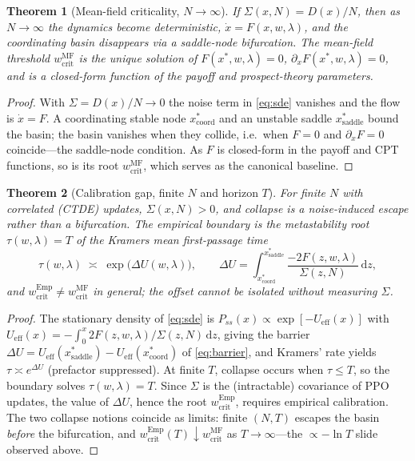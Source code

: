 \documentclass[letterpaper]{article}
\theoremstyle{plain}
\newtheorem{theorem}{Theorem}
\begin{document}
\begin{theorem}[Mean-field criticality, $N\to\infty$]\label{thm:mf}
If $\Sigma(x,N)=D(x)/N$, then as $N\to\infty$ the dynamics become deterministic,
$\dot x=F(x,w,\lambda)$, and the coordinating basin disappears via a saddle-node
bifurcation. The mean-field threshold $w_{\mathrm{crit}}^{\mathrm{MF}}$ is the
unique solution of $F(x^\ast,w,\lambda)=0$, $\partial_x F(x^\ast,w,\lambda)=0$,
and is a closed-form function of the payoff and prospect-theory parameters.
\end{theorem}
\begin{proof}
With $\Sigma=D(x)/N\to0$ the noise term in \eqref{eq:sde} vanishes and the flow
is $\dot x=F$. A coordinating stable node $x^\ast_{\mathrm{coord}}$ and an
unstable saddle $x^\ast_{\mathrm{saddle}}$ bound the basin; the basin vanishes
when they collide, i.e.\ when $F=0$ and $\partial_x F=0$ coincide---the
saddle-node condition. As $F$ is closed-form in the payoff and CPT functions, so
is its root $w_{\mathrm{crit}}^{\mathrm{MF}}$, which serves as the canonical
baseline.
\end{proof}

\begin{theorem}[Calibration gap, finite $N$ and horizon $T$]\label{thm:gap}
For finite $N$ with correlated (CTDE) updates, $\Sigma(x,N)>0$, and collapse is a
noise-induced escape rather than a bifurcation. The empirical boundary is the
metastability root $\tau(w,\lambda)=T$ of the Kramers mean first-passage time
\begin{equation}
  \tau(w,\lambda)\;\asymp\;
  \exp\!\big(\Delta U(w,\lambda)\big),\qquad
  \Delta U=\!\!\int_{x^\ast_{\mathrm{coord}}}^{x^\ast_{\mathrm{saddle}}}\!\!
    \frac{-2F(z,w,\lambda)}{\Sigma(z,N)}\,\mathrm{d}z,
  \label{eq:barrier}
\end{equation}
and $w_{\mathrm{crit}}^{\mathrm{Emp}}\neq w_{\mathrm{crit}}^{\mathrm{MF}}$ in
general; the offset cannot be isolated without measuring $\Sigma$.
\end{theorem}
\begin{proof}
The stationary density of \eqref{eq:sde} is
$P_{ss}(x)\propto\exp[-U_{\mathrm{eff}}(x)]$ with
$U_{\mathrm{eff}}(x)=-\!\int_0^x 2F(z,w,\lambda)/\Sigma(z,N)\,\mathrm{d}z$, giving
the barrier $\Delta U=U_{\mathrm{eff}}(x^\ast_{\mathrm{saddle}})
-U_{\mathrm{eff}}(x^\ast_{\mathrm{coord}})$ of \eqref{eq:barrier}, and Kramers'
rate yields $\tau\asymp e^{\Delta U}$ (prefactor suppressed). At finite $T$,
collapse occurs when $\tau\le T$, so the boundary solves
$\tau(w,\lambda)=T$. Since $\Sigma$ is the (intractable) covariance of PPO
updates, the value of $\Delta U$, hence the root $w_{\mathrm{crit}}^{\mathrm{Emp}}$,
requires empirical calibration. The two collapse notions coincide as limits:
finite $(N,T)$ escapes the basin \emph{before} the  bifurcation, and
$w_{\mathrm{crit}}^{\mathrm{Emp}}(T)\!\downarrow\!w_{\mathrm{crit}}^{\mathrm{MF}}$
as $T\to\infty$---the $\propto-\ln T$ slide observed above.
\end{proof}
\end{document}

